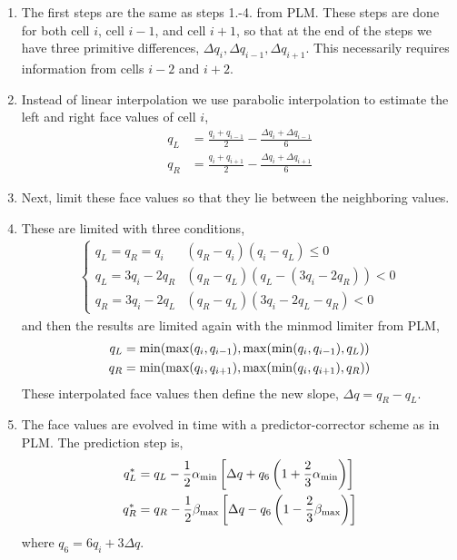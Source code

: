 \documentclass{article}
\begin{document}
\begin{enumerate}
 \item The first steps are the same as steps 1.-4. from PLM. 
These steps are done for both cell $i$, cell $i-1$, and cell $i+1$, so that at the end of the steps we have three primitive differences, $\Delta q_i, \Delta q_{i-1}, \Delta q_{i+1}$. 
This necessarily requires information from cells $i-2$ and $i+2$. 

\item Instead of linear interpolation we use parabolic interpolation to estimate the left and right face values of cell $i$,
\begin{align}
 q_L &= \frac{q_i + q_{i-1}}{2} - \frac{\Delta q_i + \Delta q_{i-1}}{6} \\
 q_R &= \frac{q_i + q_{i+1}}{2} - \frac{\Delta q_i + \Delta q_{i+1}}{6}
\end{align}

\item Next, limit these face values so that they lie between the neighboring values. 

\item These are limited with three conditions,
\begin{align}
\begin{cases}
 q_L = q_R = q_i & (q_R - q_i) (q_i - q_L) \le 0 \\
 q_L = 3 q_i - 2 q_R & (q_R - q_L) (q_L - (3 q_i - 2 q_R)) < 0 \\
 q_R = 3 q_i - 2 q_L & (q_R - q_L) ( 3 q_i - 2 q_L - q_R) < 0 
 \end{cases}
\end{align}
and then the results are limited again with the minmod limiter from PLM, 
\begin{align}
    q_L &= {\rm min}( {\rm max}(q_i,q_{i-1}), {\rm max}({\rm min}(q_i,q_{i-1}), q_L)) \\ 
    q_R &= {\rm min}( {\rm max}(q_i,q_{i+1}), {\rm max}({\rm min}(q_i,q_{i+1}), q_R)) \\ 
\end{align}
These interpolated face values then define the new slope, $\Delta q = q_R-q_L$. 

\item The face values are evolved in time with a predictor-corrector scheme as in PLM. 
The prediction step is,
\begin{align}
 q_L^* &= q_L - \frac{1}{2} \alpha_{\rm min} \left[ \Delta q + q_6 \left(1 + \frac{2}{3} \alpha_{\rm min} \right) \right] \\ 
  q_R^* &= q_R - \frac{1}{2} \beta_{\rm max} \left[ \Delta q - q_6 \left(1 - \frac{2}{3} \beta_{\rm max} \right) \right] \\ 
\end{align}
where $q_6 = 6 q_i + 3 \Delta q$.


\end{enumerate}
\end{document}
